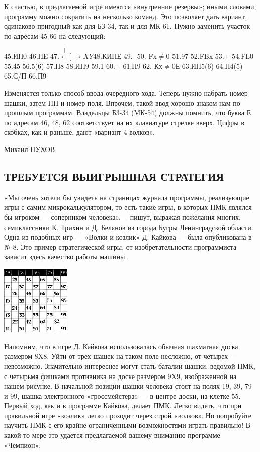 \documentclass[11pt,a4paper,oneside]{article}
\def\XY{$\stackrel[\leftarrow]{\rightarrow}{XY}$}
\begin{document}
К счастью, в предлагаемой игре имеются «внутренние резервы»; иными словами, программу можно сократить на несколько команд. Это позволяет дать вариант, одинаково пригодный как для БЗ-34, так и для МК-61. Нужно заменить участок по адресам 45-66 на следующий:

45.ИП0 46.ПE 47.\XY 48.КИПЕ 49.- 50. Fx$\neq$0 51.97 52.FBx 53.+ 54.FL0 55.45 56.5(6) 57.П8 58.ИП9 59.1 60.+ 61.П9 62. Кх$\neq$0Е 63.ИП5(6) 64.П4(5) 65.С/П 66.П9

Изменяется только способ ввода очередного хода. Теперь нужно набрать номер шашки, затем ПП и номер поля. Впрочем, такой ввод хорошо знаком нам по прошлым программам. Владельцы Б3-34 (МК-54) должны помнить, что буква Е по адресам 46, 48, 62 соответствует на их клавиатуре стрелке вверх. Цифры в скобках, как и раньше, дают «вариант 4 волков».

Михаил ПУХОВ

\subsection{ТРЕБУЕТСЯ ВЫИГРЫШНАЯ СТРАТЕГИЯ}

«Мы очень хотели бы увидеть на страницах журнала программы, реализующие игры с самим микрокалькулятором, то есть такие игры, в которых ПМК являлся бы игроком — соперником человека»,— пишут, выражая пожелания многих, семиклассники К. Трихин и Д. Белянов из города Бугры Ленинградской области. Одна из подобных игр — «Волки и козлик» Д. Кайкова — была опубликована в № 8. Это пример стратегической игры, от изобретательности программиста зависит здесь качество работы машины.

\includegraphics[width=0.25\textwidth]{win_strategy}

Напомним, что в игре Д. Кайкова использовалась обычная шахматная доска размером 8X8. Уйти от трех шашек на таком поле несложно, от четырех — невозможно. Значительно интереснее могут стать баталии шашки, ведомой ПМК, с четырьмя фишками противника на доске размером 9X9, изображенной на нашем рисунке. В начальной позиции шашки человека стоят на полях 19, 39, 79 и 99, шашка электронного «гроссмейстера» — в центре доски, на клетке 55. Первый ход, как и в программе Кайкова, делает ПМК. Легко видеть, что при правильной игре «козлик» легко проходит через строй «волков». Но попробуйте научить ПМК с его крайне ограниченными возможностями играть правильно! В какой-то мере это удается предлагаемой вашему вниманию программе «Чемпион»: 
\end{document}
